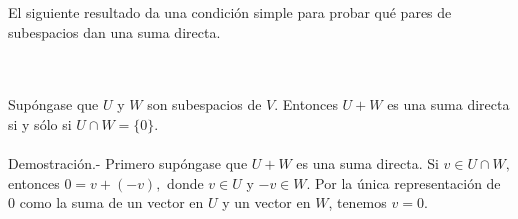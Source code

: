 El siguiente resultado da una condición simple para probar qué pares de subespacios dan una suma directa.

\begin{myteo}\,\\\\
    Supóngase que $U$ y $W$ son subespacios de $V$. Entonces $U+W$ es una suma directa si y sólo si $U \cap W = \lbrace 0 \rbrace$.\\\\
    Demostración.-\; Primero supóngase que $U+W$ es una suma directa. Si $v \in U\cap W,$ entonces $0=v+(-v),$ donde $v\in U$ y $-v\in W$. Por la única representación de $0$ como la suma de un vector en $U$ y un vector en $W$, tenemos $v=0$. 
\end{myteo}
\vspace{.5cm}


\setcounter{mysection}{2}


